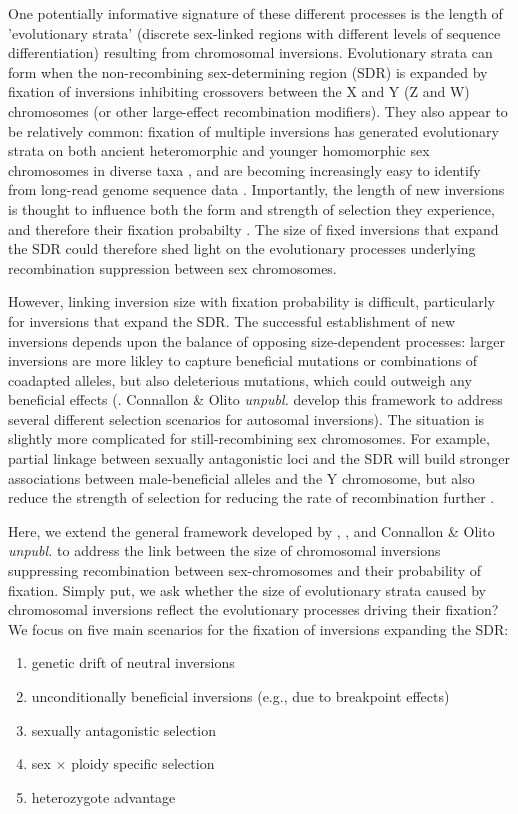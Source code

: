 \documentclass{article}
\begin{document}
One potentially informative signature of these different processes is the length of 'evolutionary strata' (discrete sex-linked regions with different levels of sequence differentiation) resulting from chromosomal inversions. Evolutionary strata can form when the non-recombining sex-determining region (SDR) is expanded by fixation of inversions inhibiting crossovers between the X and Y (Z and W) chromosomes (or other large-effect recombination modifiers). They also appear to be relatively common: fixation of multiple inversions has generated evolutionary strata on both ancient heteromorphic and younger homomorphic sex chromosomes in diverse taxa \citep{LahnPage1999,Handley2004, Wang2012}, and are becoming increasingly easy to identify from long-read genome sequence data \citep{WellenreutherBernatchez2018}. Importantly, the length of new inversions is thought to influence both the form and strength of selection they experience, and therefore their fixation probabilty \citep{vanValenLevins1968, KrimbasPowell1992}. The size of fixed inversions that expand the SDR could therefore shed light on the evolutionary processes underlying recombination suppression between sex chromosomes. 

However, linking inversion size with fixation probability is difficult, particularly for inversions that expand the SDR. The successful establishment of new inversions depends upon the balance of opposing size-dependent processes: larger inversions are more likley to capture beneficial mutations or combinations of coadapted alleles, but also deleterious mutations, which could outweigh any beneficial effects (\citealt{Nei1967,vanValenLevins1968, Santos1986, ChengKirkpatrick2019}. Connallon \& Olito {\itshape unpubl.} develop this framework to address several different selection scenarios for autosomal inversions). The situation is slightly more complicated for still-recombining sex chromosomes. For example, partial linkage between sexually antagonistic loci and the SDR will build stronger associations between male-beneficial alleles and the Y chromosome, but also reduce the strength of selection for reducing the rate of recombination further \citep{Nei1969,Otto2019}.

Here, we extend the general framework developed by \citet{vanValenLevins1968}, \citet{Santos1986}, and Connallon \& Olito {\itshape unpubl.} to address the link between the size of chromosomal inversions suppressing recombination between sex-chromosomes and their probability of fixation. Simply put, we ask whether the size of evolutionary strata caused by chromosomal inversions reflect the evolutionary processes driving their fixation? We focus on five main scenarios for the fixation of inversions expanding the SDR: 
\begin{enumerate}[label=(\roman*)]
	\item genetic drift of neutral inversions
	\item unconditionally beneficial inversions (e.g., due to breakpoint effects)
	\item sexually antagonistic selection
	\item sex $\times$ ploidy specific selection
	\item heterozygote advantage
\end{enumerate}
\end{document}
